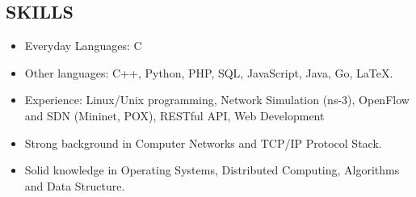 \documentclass[line]{res}
\begin{document}
\begin{resume}
	\section{SKILLS}
	\begin{itemize}
		\item Everyday Languages: C
		\item Other languages: C++, Python, PHP, SQL, JavaScript, Java, Go, LaTeX.
		\item Experience: Linux/Unix programming, Network Simulation (ns-3), OpenFlow and SDN (Mininet, POX), RESTful API, Web Development
		\item Strong background in Computer Networks and TCP/IP Protocol Stack.
		\item Solid knowledge in Operating Systems, Distributed Computing, Algorithms and Data Structure.
	\end{itemize}


\end{resume}
\end{document}
